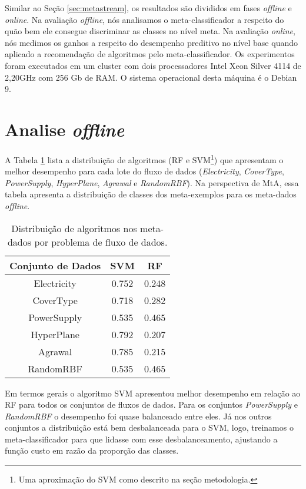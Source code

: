 \label{chap:resultados}
Similar ao Seção \ref{sec:metastream}, os resultados são divididos em fases \textit{offline} e \textit{online}. Na avaliação \textit{offline}, nós analisamos o meta-classificador a respeito do quão bem ele consegue discriminar as classes no nível meta. Na avaliação \textit{online}, nós medimos os ganhos a respeito do desempenho preditivo no nível base quando aplicado a recomendação de algoritmos pelo meta-classificador. Os experimentos foram executados em um cluster com dois processadores Intel Xeon Silver 4114 de 2,20GHz com 256 Gb de RAM. O sistema operacional desta máquina é o Debian 9.

\section{Analise \textit{offline}}

A Tabela \ref{tab:algo_dist} lista a distribuição de algoritmos (RF e SVM\footnote{Uma aproximação do SVM como descrito na seção metodologia.}) que apresentam o melhor desempenho para cada lote do fluxo de dados (\textit{Electricity}, \textit{CoverType}, \textit{PowerSupply}, \textit{HyperPlane}, \textit{Agrawal} e \textit{RandomRBF}). Na perspectiva de MtA, essa tabela apresenta a distribuição de classes dos meta-exemplos para os meta-dados \textit{offline}.

\begin{table}[ht]
\caption{Distribuição de algoritmos nos meta-dados por problema de fluxo de dados.}
\label{tab:algo_dist}
\centering
\begin{tabular}{c|c|c} \hline
    Conjunto de Dados & SVM   & RF    \\ \hline
    Electricity       & 0.752 & 0.248 \\
    CoverType         & 0.718 & 0.282 \\
    PowerSupply       & 0.535 & 0.465 \\ \hline
    HyperPlane        & 0.792 & 0.207 \\
    Agrawal           & 0.785 & 0.215 \\
    RandomRBF         & 0.535 & 0.465 \\
\end{tabular}
\end{table}

Em termos gerais o algoritmo SVM apresentou melhor desempenho em relação ao RF para todos
os conjuntos de fluxos de dados. Para os conjuntos \textit{PowerSupply} e \textit{RandomRBF} o desempenho foi quase balanceado entre eles. Já nos outros conjuntos a distribuição está bem
desbalanceada para o SVM, logo, treinamos o meta-classificador para que lidasse com esse
desbalanceamento,  ajustando a função custo em razão da proporção das classes. 

